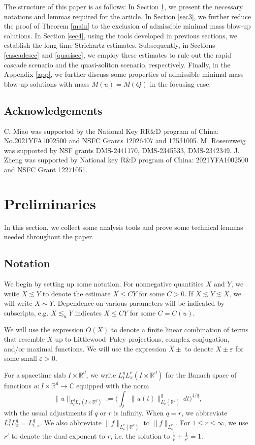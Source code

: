 \documentclass[reqno,11pt]{amsart}
\newcommand{\eps}{{\varepsilon}}
\theoremstyle{plain}
\theoremstyle{definition}
\numberwithin{equation}{section}
\numberwithin{theorem}{section}
\def\leq{\leqslant}
\def\R{\mathbb{R}}
\def\C{\mathbb{C}}
\def\eps{\varepsilon}
\begin{document}
The structure of this paper is as follows: In Section \ref{preli}, we present the necessary notations and lemmas required for the article. In Section \ref{sec3}, we further reduce the proof of Theorem \ref{main} to the exclusion of admissible minimal mass blow-up solutions. In Section \ref{sec4}, using the tools developed in previous sections, we establish the long-time Strichartz estimates. Subsequently, in Sections \ref{cascadesec} and \ref{quasisec}, we employ these estimates to rule out the rapid cascade scenario and the quasi-soliton scenario, respectively. Finally, in the Appendix \ref{app}, we further discuss some properties of admissible minimal mass blow-up solutions with mass $M(u)=M(Q)$ in the focusing case.

\subsection*{Acknowledgements} 
  C. Miao was supported by the National Key RR\&D program
of China: No.2021YFA1002500 and NSFC Grants 12026407 and 12531005. M. Rosenzweig was supported by NSF grants DMS-2441170, DMS-2345533, DMS-2342349.  J. Zheng was supported by  National key R\&D program of China: 2021YFA1002500 and  NSFC Grant 12271051.


\section{Preliminaries}\label{preli}
In this section, we  collect some  analysis tools and prove some technical lemmas needed throughout the paper. 

\subsection{Notation} We begin by setting up some notation. For nonnegative quantities $X$ and $Y$, we write $X\lesssim Y$ to denote the estimate $X\leq C Y$ for some $C>0$. If $X\lesssim Y\lesssim X$, we will write $X\sim Y$. Dependence on various parameters will be indicated by subscripts, e.g. $X\lesssim_u Y$ indicates $X\leq CY$ for some $C=C(u)$. 

We will use the expression $O(X)$ to denote a finite linear combination of terms that resemble $X$ up to Littlewood--Paley projections, complex conjugation, and/or maximal functions. We will use the expression $X\pm$ to denote $X\pm\eps$ for some small $\eps>0$. 

For a spacetime slab $I\times\R^d$, we write $L_t^q L_x^r(I\times\R^d)$ for the Banach space of functions $u:I\times\R^d\to\C$ equipped with the norm
\[
\|u\|_{L_t^{q}L_x^r(I\times\R^d)}:=\bigg(\int_I \|u(t)\|_{L_x^r(\R^d)}^q\,dt\bigg)^{1/q},
\]
with the usual adjustments if $q$ or $r$ is infinity. When $q=r$, we abbreviate $L_t^qL_x^q=L_{t,x}^q$. We also abbreviate $\|f\|_{L_x^r(\R^d)}$ to $\|f\|_{L_x^r}.$ For $1\leq r\leq\infty$, we use $r'$ to denote the dual exponent to $r$, i.e. the solution to $\frac{1}{r}+\frac{1}{r'}=1.$
\end{document}

